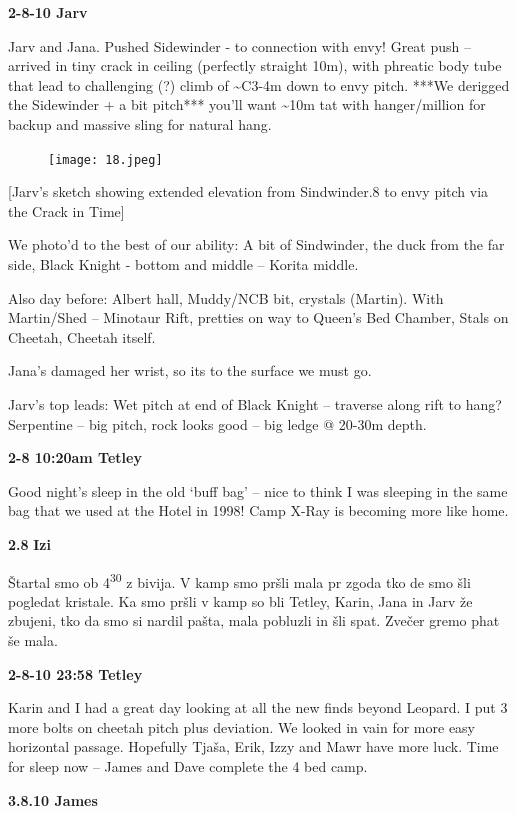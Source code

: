 \textbf{2-8-10 Jarv}

Jarv and Jana. Pushed Sidewinder - to connection with envy! Great push
-- arrived in tiny crack in ceiling (perfectly straight 10m), with
phreatic body tube that lead to challenging (?) climb of
\textasciitilde{}C3-4m down to envy pitch. ***We derigged the Sidewinder
+ a bit pitch*** you'll want \textasciitilde{}10m tat with
hanger/million for backup and massive sling for natural hang.

\begin{figure}[htbp]
\centering
\texttt{[image: 18.jpeg]}
\caption{}
\end{figure}

{[}Jarv's sketch showing extended elevation from Sindwinder.8 to envy
pitch via the Crack in Time{]}

We photo'd to the best of our ability: A bit of Sindwinder, the duck
from the far side, Black Knight - bottom and middle -- Korita middle.

Also day before: Albert hall, Muddy/NCB bit, crystals (Martin). With
Martin/Shed -- Minotaur Rift, pretties on way to Queen's Bed Chamber,
Stals on Cheetah, Cheetah itself.

Jana's damaged her wrist, so its to the surface we must go.

Jarv's top leads: Wet pitch at end of Black Knight -- traverse along
rift to hang? Serpentine -- big pitch, rock looks good -- big ledge @
20-30m depth.

\textbf{2-8 10:20am Tetley}

Good night's sleep in the old `buff bag' -- nice to think I was sleeping
in the same bag that we used at the Hotel in 1998! Camp X-Ray is
becoming more like home.

\textbf{2.8} \textbf{Izi}

Štartal smo ob 4\textsuperscript{30} z bivija. V kamp smo pršli mala pr
zgoda tko de smo šli pogledat kristale. Ka smo pršli v kamp so bli
Tetley, Karin, Jana in Jarv že zbujeni, tko da smo si nardil pašta, mala
pobluzli in šli spat. Zvečer gremo phat še mala.

\textbf{2-8-10 23:58 Tetley}

Karin and I had a great day looking at all the new finds beyond Leopard.
I put 3 more bolts on cheetah pitch plus deviation. We looked in vain
for more easy horizontal passage. Hopefully Tjaša, Erik, Izzy and Mawr
have more luck. Time for sleep now -- James and Dave complete the 4 bed
camp.

\textbf{3.8.10 James}

